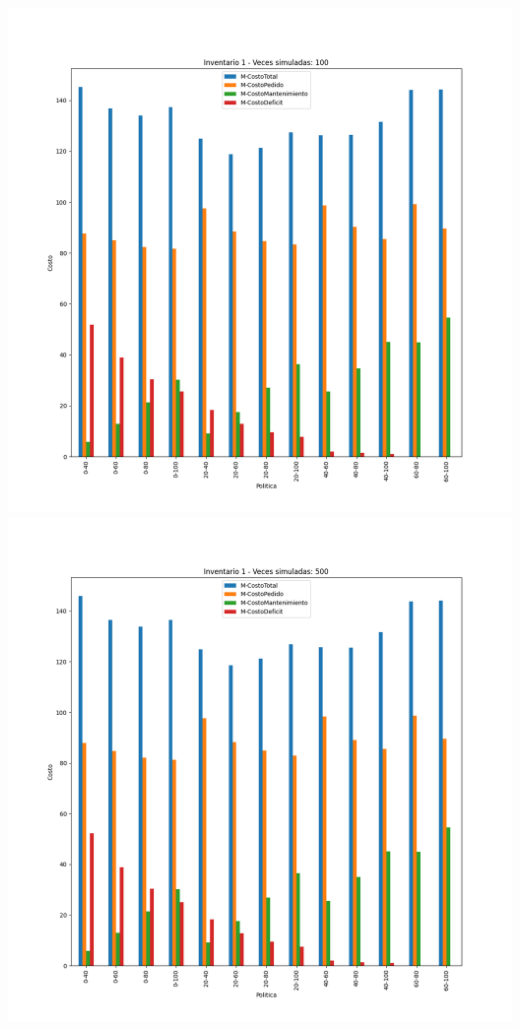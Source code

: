 \documentclass[11pt,a4paper]{report}
\begin{document}
\begin{center}
	\includegraphics[width=0.45\textheight]{img/Cap-2/inventario-1/inventario1-100veces.png}
	\includegraphics[width=0.45\textheight]{img/Cap-2/inventario-1/inventario1-500veces.png}
\end{center}
\end{document}
